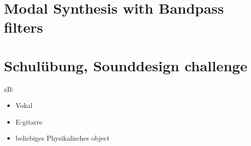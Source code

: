 \section{Modal Synthesis with Bandpass filters}


\section{Schulübung, Sounddesign challenge}

zB:
\begin{itemize}
	\item Vokal
	\item E-gitarre
	\item beliebiges Physikalisches object

\end{itemize}


